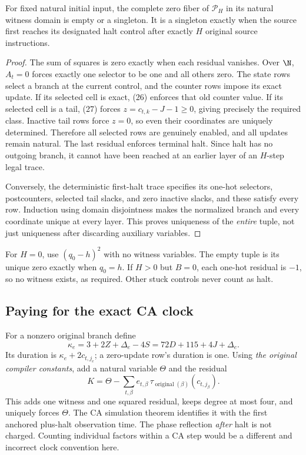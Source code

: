 \begin{theorem}\label{thm:certificate}
For fixed natural initial input, the complete zero fiber of $\mathcal P_H$ in
its natural witness domain is empty or a singleton. It is a singleton exactly
when the source first reaches its designated halt control after exactly $H$
original source instructions.
\end{theorem}
\begin{proof}
The sum of squares is zero exactly when each residual vanishes. Over $\N$,
$A_t=0$ forces exactly one selector to be one and all others zero. The state
rows select a branch at the current control, and the counter rows impose its
exact update. If its selected cell is exact, (26) enforces that old counter
value. If its selected cell is a tail, (27) forces
$z=c_{t,k}-J-1\ge0$, giving precisely the required class. Inactive tail rows
force $z=0$, so even their coordinates are uniquely determined. Therefore
all selected rows are genuinely enabled, and all updates remain natural.
The last residual enforces terminal halt. Since halt has no outgoing branch,
it cannot have been reached at an earlier layer of an $H$-step legal trace.

Conversely, the deterministic first-halt trace specifies its one-hot
selectors, postcounters, selected tail slacks, and zero inactive slacks, and
these satisfy every row. Induction using domain disjointness makes the
normalized branch and every coordinate unique at every layer. This proves
uniqueness of the \emph{entire} tuple, not just uniqueness after discarding
auxiliary variables.
\end{proof}

For $H=0$, use $(q_0-h)^2$ with no witness variables. The empty tuple is its
unique zero exactly when $q_0=h$. If $H>0$ but $B=0$, each one-hot residual
is $-1$, so no witness exists, as required. Other stuck controls never count
as halt.

\subsection{Paying for the exact CA clock}
For a nonzero original branch define
\[
 \kappa_e=3+2Z+\Delta_e-4S=72D+115+4J+\Delta_e.
\]
Its duration is $\kappa_e+2c_{t,j_e}$; a zero-update row's duration is one.
Using \emph{the original compiler constants}, add a natural variable $\Theta$
and the residual
\[
 K=\Theta-\sum_{t,\beta}e_{t,\beta}\,
               \tau_{\operatorname{original}(\beta)}(c_{t,j_\beta}).\tag{29}
\]
This adds one witness and one squared residual, keeps degree at most four,
and uniquely forces $\Theta$. The CA simulation theorem identifies it with
the first anchored plus-halt observation time. The phase reflection \emph{after}
halt is not charged. Counting individual factors within a CA step would be
a different and incorrect clock convention here.

